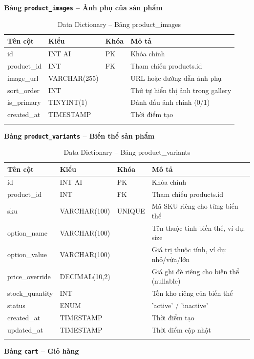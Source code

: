 \documentclass[a4paper]{article}
\begin{document}
\textbf{Bảng \texttt{product\_images} -- Ảnh phụ của sản phẩm}

\begin{longtable}{|p{3.5cm}|p{2.5cm}|p{1.5cm}|p{5cm}|}
\hline
\textbf{Tên cột} & \textbf{Kiểu} & \textbf{Khóa} & \textbf{Mô tả} \\
\hline
\endhead
id & INT AI & PK & Khóa chính \\
\hline
product\_id & INT & FK & Tham chiếu products.id \\
\hline
image\_url & VARCHAR(255) & & URL hoặc đường dẫn ảnh phụ \\
\hline
sort\_order & INT & & Thứ tự hiển thị ảnh trong gallery \\
\hline
is\_primary & TINYINT(1) & & Đánh dấu ảnh chính (0/1) \\
\hline
created\_at & TIMESTAMP & & Thời điểm tạo \\
\hline
\caption{Data Dictionary -- Bảng product\_images}
\end{longtable}

\textbf{Bảng \texttt{product\_variants} -- Biến thể sản phẩm}

\begin{longtable}{|p{3.5cm}|p{2.5cm}|p{1.5cm}|p{5cm}|}
\hline
\textbf{Tên cột} & \textbf{Kiểu} & \textbf{Khóa} & \textbf{Mô tả} \\
\hline
\endhead
id & INT AI & PK & Khóa chính \\
\hline
product\_id & INT & FK & Tham chiếu products.id \\
\hline
sku & VARCHAR(100) & UNIQUE & Mã SKU riêng cho từng biến thể \\
\hline
option\_name & VARCHAR(100) & & Tên thuộc tính biến thể, ví dụ: size \\
\hline
option\_value & VARCHAR(100) & & Giá trị thuộc tính, ví dụ: nhỏ/vừa/lớn \\
\hline
price\_override & DECIMAL(10,2) & & Giá ghi đè riêng cho biến thể (nullable) \\
\hline
stock\_quantity & INT & & Tồn kho riêng của biến thể \\
\hline
status & ENUM & & 'active' / 'inactive' \\
\hline
created\_at & TIMESTAMP & & Thời điểm tạo \\
\hline
updated\_at & TIMESTAMP & & Thời điểm cập nhật \\
\hline
\caption{Data Dictionary -- Bảng product\_variants}
\end{longtable}

\textbf{Bảng \texttt{cart} -- Giỏ hàng}
\end{document}
